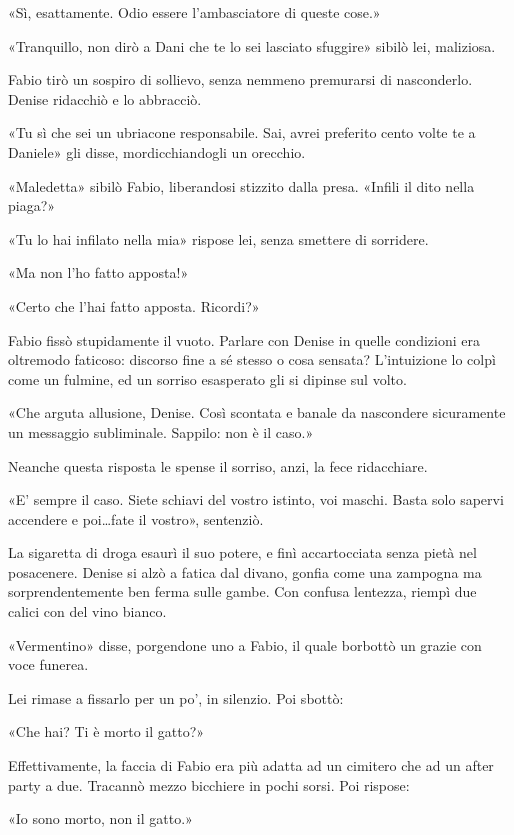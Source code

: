 «Sì, esattamente. Odio essere l'ambasciatore di queste cose.»

«Tranquillo, non dirò a Dani che te lo sei lasciato sfuggire» sibilò lei, maliziosa.

Fabio tirò un sospiro di sollievo, senza nemmeno premurarsi di nasconderlo. Denise ridacchiò e lo abbracciò.

«Tu sì che sei un ubriacone responsabile. Sai, avrei preferito cento volte te a Daniele» gli disse, mordicchiandogli un orecchio.

«Maledetta» sibilò Fabio, liberandosi stizzito dalla presa. «Infili il dito nella piaga?»

«Tu lo hai infilato nella mia» rispose lei, senza smettere di sorridere.

«Ma non l'ho fatto apposta!»

«Certo che l'hai fatto apposta. Ricordi?»

Fabio fissò stupidamente il vuoto. Parlare con Denise in quelle condizioni era oltremodo faticoso: discorso fine a sé stesso o cosa sensata? L'intuizione lo colpì come un fulmine, ed un sorriso esasperato gli si dipinse sul volto.

«Che arguta allusione, Denise. Così scontata e banale da nascondere sicuramente un messaggio subliminale. Sappilo: non è il caso.»

Neanche questa risposta le spense il sorriso, anzi, la fece ridacchiare.

«E' sempre il caso. Siete schiavi del vostro istinto, voi maschi. Basta solo sapervi accendere e poi\ldots fate il vostro», sentenziò.

La sigaretta di droga esaurì il suo potere, e finì accartocciata senza pietà nel posacenere. Denise si alzò a fatica dal divano, gonfia come una zampogna ma sorprendentemente ben ferma sulle gambe. Con confusa lentezza, riempì due calici con del vino bianco.

«Vermentino» disse, porgendone uno a Fabio, il quale borbottò un grazie con voce funerea.

Lei rimase a fissarlo per un po', in silenzio. Poi sbottò:

«Che hai? Ti è morto il gatto?»

Effettivamente, la faccia di Fabio era più adatta ad un cimitero che ad un after party a due. Tracannò mezzo bicchiere in pochi sorsi. Poi rispose:

«Io sono morto, non il gatto.»

